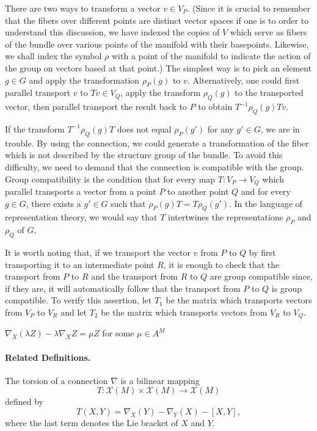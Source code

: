 \documentclass[12pt]{article}
\newcommand{\vs}{\mathcal{X}}
\begin{document}
There are two ways to transform a vector $v \in V_P$.  (Since it is crucial to remember that the fibers over different points are distinct vector spaces if one is to order to understand this discussion, we have indexed the copies of $V$ which serve as fibers of the bundle over various points of the manifold with their basepoints.  Likewise, we shall index the symbol $\rho$ with a point of the manifold to indicate the action of the group on vectors based at that point.)  The simplest way is to pick an element $g \in G$ and apply the transformation $\rho_P (g)$ to $v$.  Alternatively, one could first parallel transport $v$ to $Tv \in V_Q$, apply the transform $\rho_Q (g)$ to the transported vector, then parallel transport the result back to $P$ to obtain $T^{-1} \rho_Q (g) T v$.

If the transform $T^{-1} \rho_Q (g) T$ does not equal $\rho_P (g')$ for any $g' \in G$, we are in trouble.  By using the connection, we could generate a transformation of the fiber which is not described by the structure group of the bundle.  To avoid this difficulty, we need to demand that the connection is compatible with the group.  Group compatibility is the condition that for every map $T : V_P \to V_Q$ which parallel transports a vector from a point $P$ to another point $Q$ and for every $g \in G$, there exists a $g' \in G$ such that $\rho_P (g) T = T \rho_Q (g')$.  In the language of representation theory, we would say that $T$ intertwines the representations $\rho_P$ and $\rho_Q$ of $G$.

It is worth noting that, if we transport the vector $v$ from $P$ to $Q$ by first transporting it to an intermediate point $R$, it is enough to check that the transport from $P$ to $R$ and the transport from $R$ to $Q$ are group compatible since, if they are, it will automatically follow that the transport from $P$ to $Q$ is group compatible.  To verify this assertion, let $T_1$ be the matrix which transports vectors from $V_P$ to $V_R$ and let $T_2$ be the matrix which transports vectors from $V_R$ to $V_Q$.

$\nabla_X (\lambda Z) - \lambda \nabla_X Z = \mu Z$ for some $\mu \in A^M$

\paragraph{Related Definitions.} The torsion of a connection $\nabla$
is a bilinear mapping 
$$T:\vs(M)\times\vs(M)\rightarrow \vs(M)$$
defined by
$$T(X,Y) = \nabla_X(Y) - \nabla_Y(X) - [X,Y],$$
where the last term denotes the Lie bracket of $X$ and $Y$. 
\end{document}

